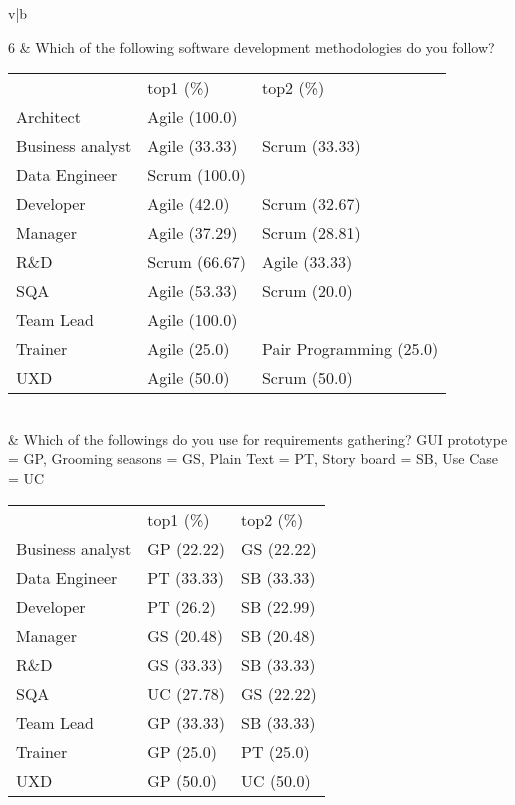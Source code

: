 \begin{table}[htbp]
\begin{tabularx}{\textwidth}{v|b}
        
        6         & Which of the following software development methodologies do you follow?\newline 
        {
        \begin{tabularx}{0.92\textwidth}{yyy}
         & top1 (\%) & top2 (\%) \\
        Architect & Agile (100.0)  &  \\
        Business analyst & Agile (33.33)  & Scrum (33.33)  \\
        Data Engineer & Scrum (100.0)  &  \\
        Developer & Agile (42.0)  & Scrum (32.67)  \\
        Manager & Agile (37.29)  & Scrum (28.81)  \\
        R\&D & Scrum (66.67)  & Agile (33.33)  \\
        SQA & Agile (53.33)  & Scrum (20.0)  \\
        Team Lead & Agile (100.0)  &  \\
        Trainer & Agile (25.0)  & Pair Programming (25.0)  \\
        UXD & Agile (50.0)  & Scrum (50.0)  \\
        \end{tabularx}
        }
        \\  & Which of the followings do you use for requirements gathering?\newline
        GUI prototype = GP, Grooming seasons = GS, Plain Text = PT, Story board = SB, Use Case = UC
        {
        \begin{tabularx}{0.92\textwidth}{yyy}
         \\
         & top1 (\%) & top2 (\%) \\
        Business analyst & GP (22.22)  & GS (22.22)  \\
        Data Engineer & PT (33.33)  & SB (33.33)  \\
        Developer & PT (26.2)  & SB (22.99)  \\
        Manager & GS (20.48)  & SB (20.48)  \\
        R\&D & GS (33.33)  & SB (33.33)  \\
        SQA & UC (27.78)  & GS (22.22)  \\
        Team Lead & GP (33.33)  & SB (33.33)  \\
        Trainer & GP (25.0)  & PT (25.0)  \\
        UXD & GP (50.0)  & UC (50.0)  \\
        \end{tabularx}
}
\end{tabularx}
\end{table}
